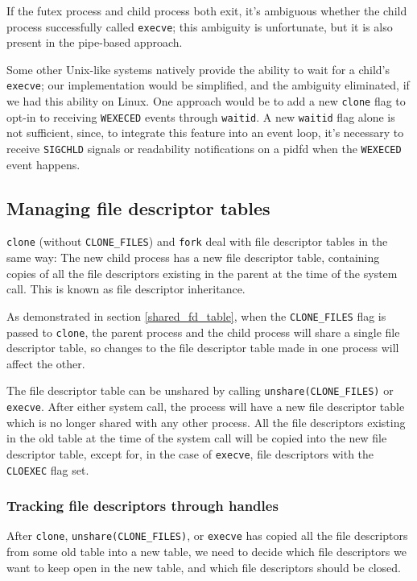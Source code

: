 \documentclass[letterpaper,twocolumn,10pt]{article}
\begin{document}
If the futex process and child process both exit,
it's ambiguous whether the child process successfully called \texttt{execve};
this ambiguity is unfortunate, but it is also present in the pipe-based approach.

Some other Unix-like systems natively provide the ability to wait for a child's \texttt{execve};
our implementation would be simplified, and the ambiguity eliminated,
if we had this ability on Linux.\cite{freebsd_kqueue}
One approach would be to add a new \texttt{clone} flag to
opt-in to receiving \texttt{WEXECED} events through \texttt{waitid}.
A new \texttt{waitid} flag alone is not sufficient,
since, to integrate this feature into an event loop,
it's necessary to receive \texttt{SIGCHLD} signals or readability notifications on a pidfd
when the \texttt{WEXECED} event happens.
\subsection{Managing file descriptor tables}\label{fdtables}
\texttt{clone} (without \verb|CLONE_FILES|) and \texttt{fork}
deal with file descriptor tables in the same way:
The new child process has a new file descriptor table,
containing copies of all the file descriptors existing in the parent at the time of the system call.
This is known as file descriptor inheritance.

As demonstrated in section \ref{shared_fd_table},
when the \verb|CLONE_FILES| flag is passed to \texttt{clone},
the parent process and the child process will share a single file descriptor table,
so changes to the file descriptor table made in one process will affect the other.

The file descriptor table can be unshared by calling \verb|unshare(CLONE_FILES)| or \texttt{execve}.
After either system call, the process will have a new file descriptor table
which is no longer shared with any other process.
All the file descriptors existing in the old table at the time of the system call
will be copied into the new file descriptor table,
except for, in the case of \texttt{execve}, file descriptors with the \texttt{CLOEXEC} flag set.
\subsubsection{Tracking file descriptors through handles}
After \texttt{clone}, \verb|unshare(CLONE_FILES)|, or \texttt{execve}
has copied all the file descriptors from some old table into a new table,
we need to decide which file descriptors we want to keep open in the new table,
and which file descriptors should be closed.
\end{document}
